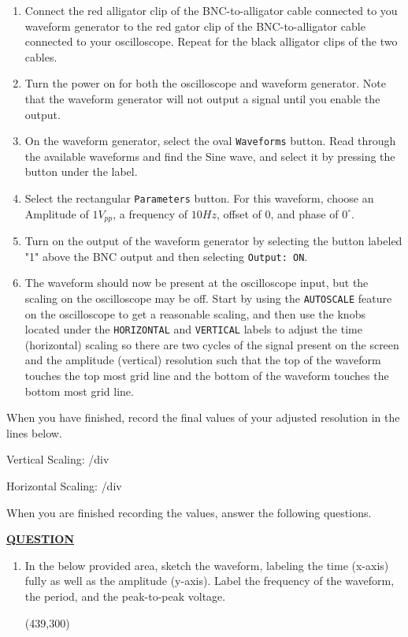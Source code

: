 \documentclass[12pt]{article}
\begin{document}
\begin{enumerate}
    \item Connect the red alligator clip of the BNC-to-alligator cable connected to you waveform generator to the red gator clip of the BNC-to-alligator cable connected to your oscilloscope. Repeat for the black alligator clips of the two cables.
    \item Turn the power on for both the oscilloscope and waveform generator. Note that the waveform generator will not output a signal until you enable the output.
    \item On the waveform generator, select the oval \texttt{Waveforms} button. Read through the available waveforms and find the Sine wave, and select it by pressing the button under the label.
    \item Select the rectangular \texttt{Parameters} button. For this waveform, choose an Amplitude of $1V_{pp}$, a frequency of $10 Hz$, offset of 0, and phase of $0^{\circ}$.
    \item Turn on the output of the waveform generator by selecting the button labeled "1" above the BNC output and then selecting \texttt{Output: ON}.
    \item The waveform should now be present at the oscilloscope input, but the scaling on the oscilloscope may be off. Start by using the \texttt{AUTOSCALE} feature on the oscilloscope to get a reasonable scaling, and then use the knobs located under the \texttt{HORIZONTAL} and \texttt{VERTICAL} labels to adjust the time (horizontal) scaling so there are two cycles of the signal present on the screen and the amplitude (vertical) resolution such that the top of the waveform touches the top most grid line and the bottom of the waveform touches the bottom most grid line.
\end{enumerate}

When you have finished, record the final values of your adjusted resolution in the lines below.
\begin{center}
    Vertical Scaling:   \underline{\hspace{4cm}} /div
    
    Horizontal Scaling: \underline{\hspace{4cm}} /div
\end{center}

When you are finished recording the values, answer the following questions.

\textbf{\underline{QUESTION}}
\begin{enumerate}
    \item  In the below provided area, sketch the waveform, labeling the time (x-axis) fully as well as the amplitude (y-axis). Label the frequency of the waveform, the period, and the peak-to-peak voltage.
    
    \framebox(439,300){}
\end{enumerate}
\end{document}
